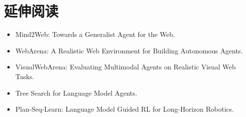 \documentclass[a4paper]{article}
\begin{document}
\section{延伸阅读}
\begin{itemize}
\item Mind2Web: Towards a Generalist Agent for the Web.
\item WebArena: A Realistic Web Environment for Building Autonomous Agents.
\item VisualWebArena: Evaluating Multimodal Agents on Realistic Visual Web Tasks.
\item Tree Search for Language Model Agents.
\item Plan-Seq-Learn: Language Model Guided RL for Long-Horizon Robotics.
\end{itemize}
\end{document}
